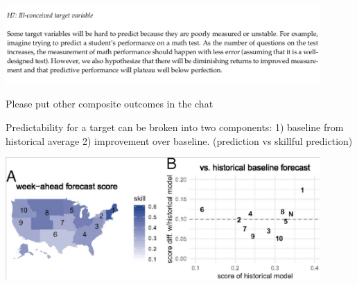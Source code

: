 \documentclass[aspectratio=169]{beamer}
\begin{document}
\begin{frame}

\begin{center}
\includegraphics[width = 0.9\textwidth]{figures/preread_outcome}
\end{center}

\vfill 
Please put other composite outcomes in the chat

\end{frame}
\begin{frame}

\begin{center}
\end{center}

\end{frame}
\begin{frame}

Predictability for a target can be broken into two components: 1) baseline from historical average 2) improvement over baseline. (prediction vs skillful prediction) 

\pause
\begin{center}
\includegraphics[width = 0.9\textwidth]{figures/reich_collaborative_2019_fig3ab}
\end{center}

\end{frame}
\end{document}
